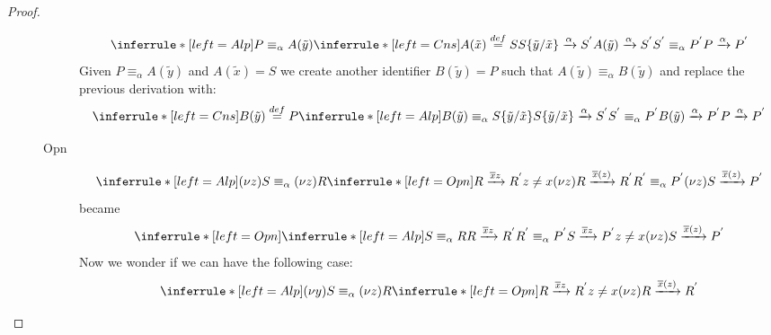 \begin{theorem}
\begin{proof}
\begin{description}
\begin{description}
	    \[
	      \inferrule* [left=Alp]{
		  P\equiv_{\alpha}A(\tilde{y})
		\\
		  \inferrule* [left=Cns]{
		      A(\tilde{x}) \stackrel{def}{=} S
		    \\
		      S\{\tilde{y}/\tilde{x}\} \xrightarrow{\alpha} S^{'}
		  }{
		    A(\tilde{y}) \xrightarrow{\alpha} S^{'}
		  }
		\\
		  S^{'}\equiv_{\alpha}P^{'}
	      }{
		P \xrightarrow{\alpha} P^{'}
	      }
	    \]
	    Given $P\equiv_{\alpha}A(\tilde{y})$ and $A(\tilde{x})=S$ we create another identifier $B(\tilde{y})=P$ such that $A(\tilde{y})\equiv_{\alpha}B(\tilde{y})$ and replace the previous derivation with:
	    \[
	      \inferrule* [left=Cns]{
		  B(\tilde{y})\stackrel{def}{=}P
		\\
		  \inferrule* [left=Alp]{
		      B(\tilde{y})\equiv_{\alpha}S\{\tilde{y}/\tilde{x}\}
		    \\
		      S\{\tilde{y}/\tilde{x}\} \xrightarrow{\alpha} S^{'}
		    \\
		      S^{'}\equiv_{\alpha}P^{'}
		  }{
		    B(\tilde{y})\xrightarrow{\alpha} P^{'}
		  }
	      }{
		P\xrightarrow{\alpha} P^{'}
	      }
	    \]
	  \item[Opn]
	    \[
	      \inferrule* [left=Alp]{
		  (\nu z) S \equiv_{\alpha} (\nu z) R 
		\\
		  \inferrule* [left=Opn]{
		      R \xrightarrow{\overline{x}z} R^{'}
		    \\
		      z\neq x
		  }{
		    (\nu z) R \xrightarrow{\overline{x}(z)} R^{'}
		  }
		\\
		  R^{'} \equiv_{\alpha} P^{'}
	      }{
		(\nu z) S \xrightarrow{\overline{x}(z)} P^{'}
	      }
	    \]
	    became
	    \[
	      \inferrule* [left=Opn]{
		  \inferrule* [left=Alp]{
		      S \equiv_{\alpha} R 
		    \\
		      R \xrightarrow{\overline{x}z} R^{'}	
		    \\
		      R^{'} \equiv_{\alpha} P^{'}
		  }{
		    S \xrightarrow{\overline{x}z} P^{'}
		  }
		\\
		  z\neq x
	      }{
		(\nu z) S \xrightarrow{\overline{x}(z)} P^{'}
	      }
	    \]
	    Now we wonder if we can have the following case:
	    \[
	      \inferrule* [left=Alp]{
		  (\nu y) S \equiv_{\alpha} (\nu z) R 
		\\
		  \inferrule* [left=Opn]{
		      R \xrightarrow{\overline{x}z} R^{'}
		    \\
		      z\neq x
		  }{
		    (\nu z) R \xrightarrow{\overline{x}(z)} R^{'}
		  }
		\\
}\]
\end{description}
\end{description}
\end{proof}
\end{theorem}
